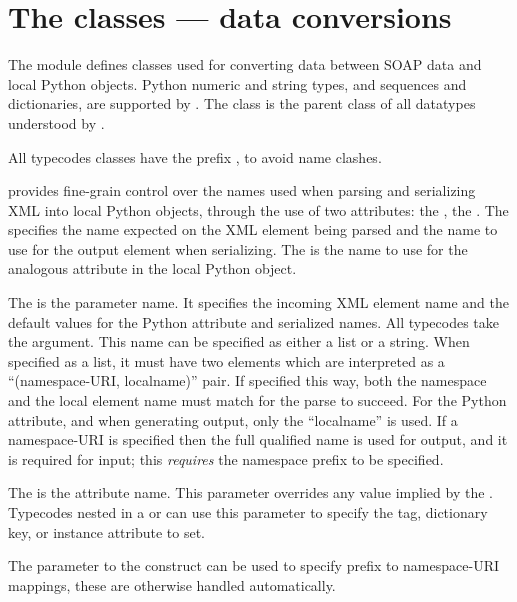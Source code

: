 \chapter{The  classes --- data conversions}

The  module defines classes used for converting data
between SOAP data and local Python objects.
Python numeric and string types, and sequences and dictionaries, are
supported by \ZSI{}.
The  class is the parent class of all datatypes
understood by \ZSI{}.

All typecodes classes have the prefix , to avoid name clashes.

\ZSI{} provides fine-grain control over the names used when parsing and
serializing XML into local Python objects, through the use of two
attributes: the , the .  The  specifies the
name expected on the XML element being parsed and the name to use for the output element
when serializing.  The  is the name to use for the analogous
attribute in the local Python object.

The  is the parameter name. It specifies the incoming
XML element name and the default values for the Python attribute
and serialized names.  All typecodes take the  argument.  This name can be
specified as either a list or a string.  When specified as a list, it must have
two elements which are interpreted as a ``(namespace-URI, localname)'' pair.
If specified this way, both the namespace and the local element name
must match for the parse to succeed.  For the Python attribute, and
when generating output, only the ``localname'' is used. If a namespace-URI is
specified then the full qualified name is used for output, and it is required
for input; this \emph{requires} the namespace prefix to be specified.

The  is the attribute name.  This parameter overrides
any value implied by the .  Typecodes nested in a 
or  can use this parameter to specify
the tag, dictionary key, or instance attribute to set.

The  parameter to the  construct can be used to
specify prefix to namespace-URI mappings, these are otherwise handled automatically.

